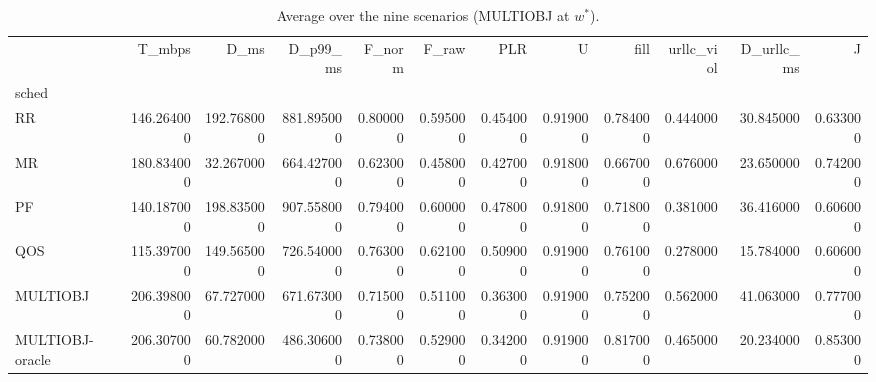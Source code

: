 \begin{table}
\caption{Average over the nine scenarios (MULTIOBJ at $w^*$).}
\label{tab:cmp}
\begin{tabular}{lrrrrrrrrrrr}
\toprule
 & T_mbps & D_ms & D_p99_ms & F_norm & F_raw & PLR & U & fill & urllc_viol & D_urllc_ms & J \\
sched &  &  &  &  &  &  &  &  &  &  &  \\
\midrule
RR & 146.264000 & 192.768000 & 881.895000 & 0.800000 & 0.595000 & 0.454000 & 0.919000 & 0.784000 & 0.444000 & 30.845000 & 0.633000 \\
MR & 180.834000 & 32.267000 & 664.427000 & 0.623000 & 0.458000 & 0.427000 & 0.918000 & 0.667000 & 0.676000 & 23.650000 & 0.742000 \\
PF & 140.187000 & 198.835000 & 907.558000 & 0.794000 & 0.600000 & 0.478000 & 0.918000 & 0.718000 & 0.381000 & 36.416000 & 0.606000 \\
QOS & 115.397000 & 149.565000 & 726.540000 & 0.763000 & 0.621000 & 0.509000 & 0.919000 & 0.761000 & 0.278000 & 15.784000 & 0.606000 \\
MULTIOBJ & 206.398000 & 67.727000 & 671.673000 & 0.715000 & 0.511000 & 0.363000 & 0.919000 & 0.752000 & 0.562000 & 41.063000 & 0.777000 \\
MULTIOBJ-oracle & 206.307000 & 60.782000 & 486.306000 & 0.738000 & 0.529000 & 0.342000 & 0.919000 & 0.817000 & 0.465000 & 20.234000 & 0.853000 \\
\bottomrule
\end{tabular}
\end{table}
